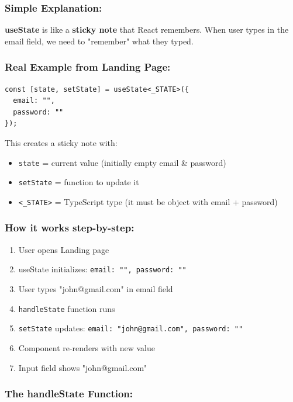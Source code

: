 \documentclass[12pt]{article}
\begin{document}
\subsubsection*{Simple Explanation:}

\textbf{useState} is like a \textbf{sticky note} that React remembers. When user types in the email field, we need to "remember" what they typed.

\subsubsection*{Real Example from Landing Page:}

\begin{lstlisting}
const [state, setState] = useState<_STATE>({ 
  email: "", 
  password: "" 
});
\end{lstlisting}

This creates a sticky note with:
\begin{itemize}
    \item \texttt{state} = current value (initially empty email \& password)
    \item \texttt{setState} = function to update it
    \item \texttt{<\_STATE>} = TypeScript type (it must be object with email + password)
\end{itemize}

\subsubsection*{How it works step-by-step:}

\begin{enumerate}
    \item User opens Landing page
    \item useState initializes: \texttt{email: "", password: ""}
    \item User types "john@gmail.com" in email field
    \item \texttt{handleState} function runs
    \item \texttt{setState} updates: \texttt{email: "john@gmail.com", password: ""}
    \item Component re-renders with new value
    \item Input field shows "john@gmail.com"
\end{enumerate}

\subsubsection*{The handleState Function:}
\end{document}
